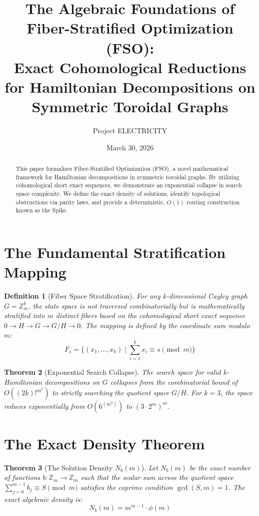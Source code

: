 \documentclass[12pt,a4paper]{article}
\title{The Algebraic Foundations of Fiber-Stratified Optimization (FSO): \\
Exact Cohomological Reductions for Hamiltonian Decompositions on Symmetric Toroidal Graphs}
\author{Project ELECTRICITY}
\date{March 30, 2026}
\newtheorem{theorem}{Theorem}[section]
\newtheorem{definition}[theorem]{Definition}
\begin{document}
\maketitle

\begin{abstract}
This paper formalizes Fiber-Stratified Optimization (FSO), a novel mathematical framework for Hamiltonian decompositions in symmetric toroidal graphs. By utilizing cohomological short exact sequences, we demonstrate an exponential collapse in search space complexity. We define the exact density of solutions, identify topological obstructions via parity laws, and provide a deterministic, $O(1)$ routing construction known as the Spike.
\end{abstract}

\section{The Fundamental Stratification Mapping}

\begin{definition}[Fiber Space Stratification]
For any $k$-dimensional Cayley graph $G = \mathbb{Z}_m^k$, the state space is not traversed combinatorially but is mathematically stratified into $m$ distinct fibers based on the cohomological short exact sequence $0 \to H \to G \to G/H \to 0$. The mapping is defined by the coordinate sum modulo $m$:
\[ F_s = \{(x_1, \dots, x_k) \mid \sum_{i=1}^{k} x_i \equiv s \pmod m\} \]
\end{definition}

\begin{theorem}[Exponential Search Collapse]
The search space for valid $k$-Hamiltonian decompositions on $G$ collapses from the combinatorial bound of $O((2k)!^{m^k})$ to strictly searching the quotient space $G/H$. For $k=3$, the space reduces exponentially from $O(6^{(m^3)})$ to $(3 \cdot 2^m)^m$.
\end{theorem}

\section{The Exact Density Theorem}

\begin{theorem}[The Solution Density $N_b(m)$]
Let $N_b(m)$ be the exact number of functions $b: \mathbb{Z}_m \to \mathbb{Z}_m$ such that the scalar sum across the quotient space $\sum_{j=0}^{m-1} b_j \equiv S \pmod m$ satisfies the coprime condition $\gcd(S, m) = 1$. The exact algebraic density is:
\[ N_b(m) = m^{m-1} \cdot \phi(m) \]
\end{theorem}
\end{document}
